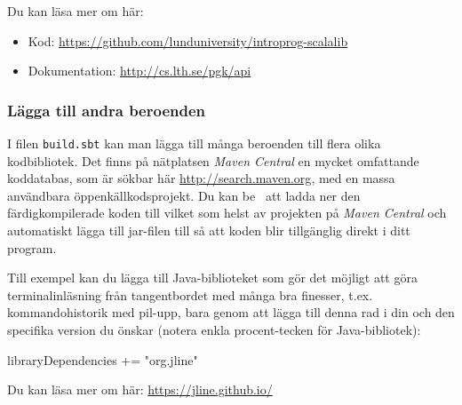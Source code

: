 Du kan läsa mer om  här: 
\begin{itemize}
  \item Kod: \url{https://github.com/lunduniversity/introprog-scalalib}
	\item Dokumentation: \url{http://cs.lth.se/pgk/api}
\end{itemize}


\subsubsection{Lägga till andra beroenden}

I filen \texttt{build.sbt} kan man lägga till många beroenden till flera olika kodbibliotek. Det finns på nätplatsen \textit{Maven Central} en mycket omfattande koddatabas, som är sökbar här \url{http://search.maven.org}, med en massa användbara öppenkällkodsprojekt. Du kan be \sbt\ att ladda ner den färdigkompilerade koden till vilket som helst av projekten på \textit{Maven Central} och automatiskt lägga till jar-filen till  så att koden blir tillgänglig direkt i ditt program.

Till exempel kan du lägga till Java-biblioteket  som gör det möjligt att göra terminalinläsning från tangentbordet med många bra finesser, t.ex. kommandohistorik med pil-upp, bara genom att lägga till denna rad i din  och den specifika version du önskar (notera enkla procent-tecken för Java-bibliotek):

\begin{Code}
libraryDependencies += "org.jline" %
\end{Code}
Du kan läsa mer om  här: \url{https://jline.github.io/}

